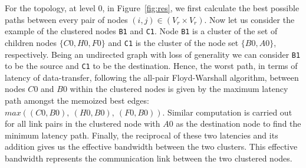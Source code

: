 \begin{itemize}
  For the topology, at level 0, in Figure~\ref{fig:res}, we first
  calculate the best possible paths between every pair of nodes
  \mbox{$(i,j) \in (V_r \times V_r)$}. Now let us consider the example
  of the clustered nodes \texttt{B1} and \texttt{C1}. Node \texttt{B1}
  is a cluster of the set of children nodes $\{C0, H0, F0\}$ and
  \texttt{C1} is the cluster of the node set $\{B0, A0\}$,
  respectively. Being an undirected graph with loss of generality we can
  consider \texttt{B1} to be the source and \texttt{C1} to be the
  destination. Hence, the worst path, in terms of latency of
  data-transfer, following the all-pair Floyd-Warshall algorithm,
  between nodes $C0$ and $B0$ within the clustered nodes is given by the
  maximum latency path amongst the memoized best edges: $max((C0,B0),\
  (H0,B0),\ (F0,B0))$. Similar computation is carried out for all link
  pairs in the clustered node with $A0$ as the destination node to find
  the minimum latency path. Finally, the reciprocal of these two
  latencies and its addition gives us the effective bandwidth between
  the two clusters. This effective bandwidth represents the
  communication link between the two clustered nodes.




\end{itemize}

